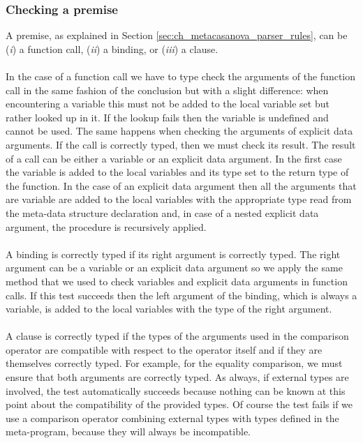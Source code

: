 \subsubsection{Checking a premise}
A premise, as explained in Section \ref{sec:ch_metacasanova_parser_rules}, can be (\textit{i}) a function call, (\textit{ii}) a binding, or (\textit{iii}) a clause.\\\\
In the case of a function call we have to type check the arguments of the function call in the same fashion of the conclusion but with a slight difference: when encountering a variable this must not be added to the local variable set but rather looked up in it. If the lookup fails then the variable is undefined and cannot be used. The same happens when checking the arguments of explicit data arguments. If the call is correctly typed, then we must check its result. The result of a call can be either a variable or an explicit data argument. In the first case the variable is added to the local variables and its type set to the return type of the function. In the case of an explicit data argument then all the arguments that are variable are added to the local variables with the appropriate type read from the meta-data structure declaration and, in case of a nested explicit data argument, the procedure is recursively applied.\\\\
A binding is correctly typed if its right argument is correctly typed. The right argument can be a variable or an explicit data argument so we apply the same method that we used to check variables and explicit data arguments in function calls. If this test succeeds then the left argument of the binding, which is always a variable, is added to the local variables with the type of the right argument.\\\\
A clause is correctly typed if the types of the arguments used in the comparison operator are compatible with respect to the operator itself and if they are themselves correctly typed. For example, for the equality comparison, we must ensure that both arguments are correctly typed. As always, if external types are involved, the test automatically succeeds because nothing can be known at this point about the compatibility of the provided types. Of course the test fails if we use a comparison operator combining external types with types defined in the meta-program, because they will always be incompatible.

